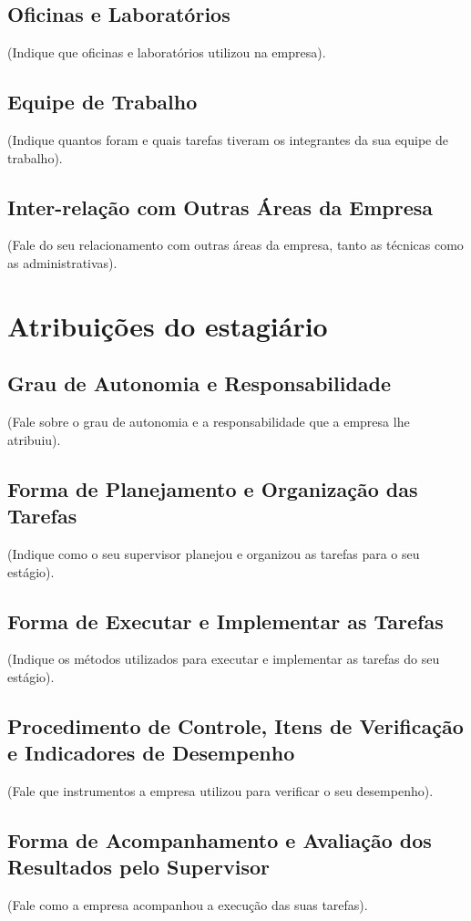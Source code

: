 \documentclass[
	12pt,				%
	openright,			%
	oneside,			%
	a4paper,			%
	english,			%
	french,				%
	spanish,			%
	brazil				%
	]{abntex2}
\begin{document}
\section{Oficinas e Laboratórios}
(Indique que oficinas e laboratórios utilizou na empresa).

\section{Equipe de Trabalho}
(Indique quantos foram e quais tarefas tiveram os integrantes da sua equipe de
trabalho).

\section{Inter-relação com Outras Áreas da Empresa}
(Fale do seu relacionamento com outras áreas da empresa, tanto as técnicas como
as administrativas).

\chapter{Atribuições do estagiário}
\section{Grau de Autonomia e Responsabilidade}
(Fale sobre o grau de autonomia e a responsabilidade que a empresa lhe atribuiu).

\section{Forma de Planejamento e Organização das Tarefas}
(Indique como o seu supervisor planejou e organizou as tarefas para o seu estágio).

\section{Forma de Executar e Implementar as Tarefas}
(Indique os métodos utilizados para executar e implementar as tarefas do seu
estágio).
\section{Procedimento de Controle, Itens de Verificação e Indicadores de
Desempenho}
(Fale que instrumentos a empresa utilizou para verificar o seu desempenho).

\section{Forma de Acompanhamento e Avaliação dos Resultados pelo
Supervisor}
(Fale como a empresa acompanhou a execução das suas tarefas).
\end{document}
